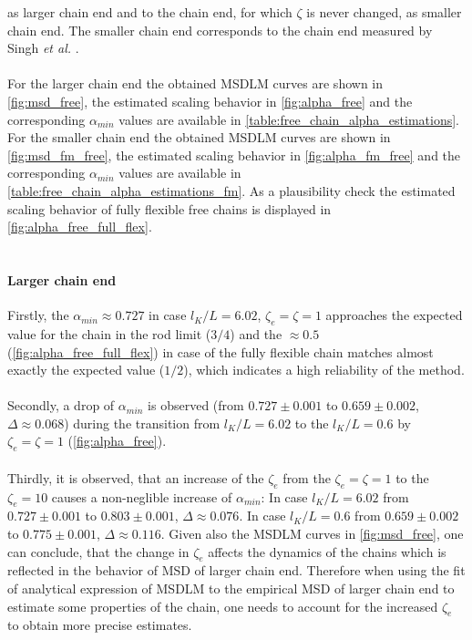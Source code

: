 \documentclass[
    paper=A4,pagesize=automedia,fontsize=12pt,
    BCOR=15mm,DIV=22,
    twoside,headinclude,footinclude=false,
    fleqn,             %
    bibliography=totocnumbered,          %
    listof=totoc,                %
    listof=flat,                 %
    cleardoublepage=empty      %
    numbers=endperiod
]{scrartcl}
\begin{document}
as larger chain end and to the chain end, for which $\zeta$ is never changed, as 
smaller chain end. The smaller chain end corresponds to the 
chain end measured by Singh \emph{et al.} \cite{Singh:2022}.
\\
\\
For the larger chain end the obtained MSDLM curves are shown in 
\autoref{fig:msd_free}, the estimated scaling 
behavior in \autoref{fig:alpha_free} and the 
corresponding $\alpha_{min}$ values are available in 
\autoref{table:free_chain_alpha_estimations}.
For the smaller chain end the obtained MSDLM curves are shown in 
\autoref{fig:msd_fm_free}, the estimated scaling 
behavior in \autoref{fig:alpha_fm_free} and the 
corresponding $\alpha_{min}$ values are available in 
\autoref{table:free_chain_alpha_estimations_fm}.
As a plausibility check the estimated scaling behavior of fully flexible free chains is
displayed in \autoref{fig:alpha_free_full_flex}. 
\\
\\
\paragraph{Larger chain end}
Firstly, the $\alpha_{min} \approx 0.727$
in case $l_K/L=6.02$, $\zeta_e=\zeta=1$ approaches the expected value for 
the chain in the rod limit ($3/4$) 
and the $\approx 0.5$ (\autoref{fig:alpha_free_full_flex}) in 
case of the fully flexible chain matches almost exactly the expected value 
($1/2$), which indicates a high reliability of the method.
\\
\\
Secondly, a drop of $\alpha_{min}$ is observed 
(from $0.727\pm0.001$ to $0.659\pm0.002$, $\Delta\approx0.068$) during the
transition from $l_K/L=6.02$ to the $l_K/L=0.6$ by $\zeta_e=\zeta=1$ 
(\autoref{fig:alpha_free}).
\\
\\
Thirdly, it is observed, that an
increase of the $\zeta_e$ from the $\zeta_e=\zeta=1$ to the $\zeta_e=10$ causes a 
non-neglible increase of $\alpha_{min}$:
In case $l_K/L=6.02$ from $0.727 \pm 0.001$ to $0.803 \pm 0.001$, $\Delta\approx0.076$.
In case $l_K/L=0.6$ from $0.659 \pm 0.002$ to $0.775 \pm 0.001$, $\Delta\approx0.116$.
Given also the MSDLM curves in \autoref{fig:msd_free}, one can conclude,
that the change in $\zeta_e$ affects the dynamics of the chains which is reflected in
the behavior of MSD of larger chain end. Therefore when using the fit of 
analytical expression of MSDLM
to the empirical MSD of larger chain end to estimate some properties of the chain, 
one needs to account for the increased $\zeta_e$ to obtain more precise estimates.
\end{document}
